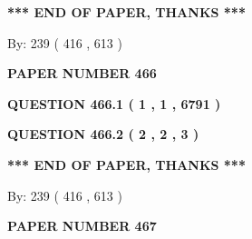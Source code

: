 \documentclass[12pt]{article}
\begin{document}
  
   
   
 \vspace{0.2in}
 
   
   
   
   
\vspace{1.0in} 
{\textbf{\large{ *** END OF PAPER, THANKS *** }}} 
   
   
\hspace{1.0in} By: 
 239 ( 416 ,  613 )
   
   
   
   
\newpage 
\setcounter{page}{ 
   466001 } 
   
   
   
   
 {\textbf{ \Large{ PAPER NUMBER  466  }}}
   
   
\vspace{0.2in}
   
   
   
   
   
   
 \vspace{0.2in}
 
 
 
 
   
   
  
\vspace{0.2in}
  
{\textbf{\Large{QUESTION
466.1 
 ( 1 , 1 , 6791 )
}}}
  
  
  
\vspace{0.2in}
  
{\textbf{\Large{QUESTION
466.2 
 ( 2 , 2 , 3 )
}}}
  
  
   
   
 \vspace{0.2in}
 
   
   
   
   
\vspace{1.0in} 
{\textbf{\large{ *** END OF PAPER, THANKS *** }}} 
   
   
\hspace{1.0in} By: 
 239 ( 416 ,  613 )
   
   
   
   
\newpage 
\setcounter{page}{ 
   467001 } 
   
   
   
   
 {\textbf{ \Large{ PAPER NUMBER  467  }}}
   
\end{document}
